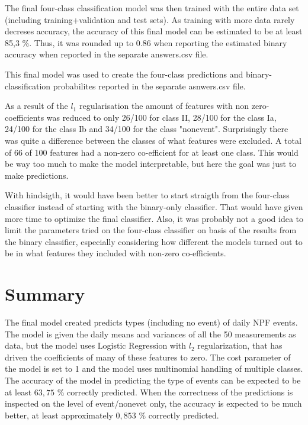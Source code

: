 \documentclass[a4size, 12pt]{report}
\begin{document}
	The final four-class classification model was then trained with the entire data set (including training+validation and test sets). As training with more data rarely decreses accuracy, the accuracy of this final model can be estimated to be at least 85,3 \%. Thus, it was rounded up to 0.86 when reporting the estimated binary accuracy when reported in the separate answers.csv file. %
	
	This final model was used to create the four-class predictions and binary-classification probabilites reported in the separate asnwers.csv file.
	
		As a result of the $l_1$ regularisation the amount of features with non zero-coefficients was reduced to only 26/100 for class II, 28/100 for the class Ia, 24/100 for the class Ib and 34/100 for the class "nonevent". Surprisingly there was quite a difference between the classes of what features were excluded. A total of 66 of 100 features had a non-zero co-efficient for at least one class. This would be way too much to make the model interpretable, but here the goal was just to make predictions. 
	
	With hindsigth, it would have been better to start straigth from the four-class classifier instead of starting with the binary-only classifier. That would have given more time to optimize the final classifier. Also, it was probably not a good idea to limit the parameters tried on the four-class classifier on basis of the results from the binary classifier, especially considering how different the models turned out to be in what features they included with non-zero co-efficients.
	
\section*{Summary}

The final model created predicts types (including no event) of daily NPF events. The 
model is given the daily means and variances of all the 50 measurements as data, but the 
model uses Logistic Regression with $l_2$ regularization, that has driven the 
coefficients of many of these features to zero. The cost parameter of the model is set 
to 1 and the model uses multinomial handling of multiple classes. The accuracy of the 
model in predicting the type of events can be expected to be at least $63,75$ \% 
correctly predicted. When the correctness of the predictions is inspected on the level 
of event/nonevet only, the accuracy is expected to be much better, at least 
approximately $0,853$  \% correctly predicted.
\end{document}
